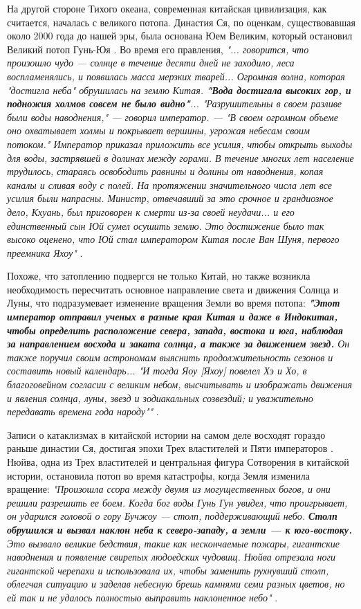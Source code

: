 \documentclass[10pt,twocolumn,letterpaper]{article}
\begin{document}
На другой стороне Тихого океана, современная китайская цивилизация, как считается, началась с великого потопа. Династия Ся, по оценкам, существовавшая около 2000 года до нашей эры, была основана Юем Великим, который остановил Великий потоп Гунь-Юя \cite{6}. Во время его правления, \textit{"... говорится, что произошло чудо — солнце в течение десяти дней не заходило, леса воспламенялись, и появилась масса мерзких тварей... Огромная волна, которая "достигла неба" обрушилась на землю Китая. \textbf{"Вода достигала высоких гор, и подножия холмов совсем не было видно"}... "Разрушительны в своем разливе были воды наводнения," — говорил император. — "В своем огромном объеме оно охватывает холмы и покрывает вершины, угрожая небесам своим потоком." Император приказал приложить все усилия, чтобы открыть выходы для воды, застрявшей в долинах между горами. В течение многих лет население трудилось, стараясь освободить равнины и долины от наводнения, копая каналы и сливая воду с полей. На протяжении значительного числа лет все усилия были напрасны. Министр, отвечавший за это срочное и грандиозное дело, Кхуань, был приговорен к смерти из-за своей неудачи... и его единственный сын Юй сумел осушить землю. Это достижение было так высоко оценено, что Юй стал императором Китая после Ван Шуня, первого преемника Яхоу"} \cite{5}.

Похоже, что затоплению подвергся не только Китай, но также возникла необходимость пересчитать основное направление света и движения Солнца и Луны, что подразумевает изменение вращения Земли во время потопа: \textit{\textbf{"Этот император отправил ученых в разные края Китая и даже в Индокитая, чтобы определить расположение севера, запада, востока и юга, наблюдая за направлением восхода и заката солнца, а также за движением звезд.} Он также поручил своим астрономам выяснить продолжительность сезонов и составить новый календарь... "И тогда Яоу [Яхоу] повелел Хэ и Хо, в благоговейном согласии с великим небом, высчитывать и изображать движения и явления солнца, луны, звезд и зодиакальных созвездий; и уважительно передавать времена года народу""} \cite{5}.

Записи о катаклизмах в китайской истории на самом деле восходят гораздо раньше династии Ся, достигая эпохи Трех властителей и Пяти императоров \cite{7}. Нюйва, одна из Трех властителей и центральная фигура Сотворения в китайской истории, остановила потоп во время катастрофы, когда Земля изменила вращение: \textit{"Произошла ссора между двумя из могущественных богов, и они решили разрешить ее боем. Когда бог воды Гунь Гун увидел, что проигрывает, он ударился головой о гору Бучжоу — столп, поддерживающий небо. \textbf{Столп обрушился и вызвал наклон неба к северо-западу, а земли — к юго-востоку.} Это вызвало великие бедствия, такие как нескончаемые пожары, гигантские наводнения и появление свирепых людоедских чудовищ. Нюйва отрезала ноги гигантской черепахи и использовала их, чтобы заменить рухнувший столп, облегчая ситуацию и заделав небесную брешь камнями семи разных цветов, но ей так и не удалось полностью выправить наклоненное небо"} \cite{8}.
\end{document}
